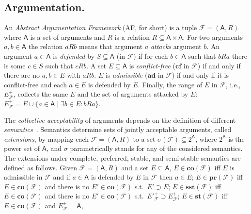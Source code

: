 \documentclass[conference,compsocconf]{IEEEtran}
\newcommand{\powerset}[1]{\ensuremath{2^{#1}}} %
\newcommand{\AF}{\ensuremath{\mathcal{F}}\xspace} %
\newcommand{\F}{\ensuremath{\mathcal{F}}\xspace} %
\newcommand{\args}{\ensuremath{\mathsf{A}}\xspace} %
\newcommand{\atts}{\ensuremath{R}\xspace}
\newcommand{\attackers}[2]{\ensuremath{\mathcal{F}_{#1}(#2)\xspace}} %
\newcommand{\AFC}{\ensuremath{\AF=(\args,\atts)}\xspace} %
\newcommand{\cA}{\ensuremath{\mathcal{A}}} %
\newcommand{\cB}{\ensuremath{\mathcal{B}}} %
\newcommand{\cC}{\ensuremath{\mathcal{C}}} %
\newcommand{\af}{AF}
\newcommand{\cf}{\mathbf{cf}}
\newcommand{\ad}{\mathbf{ad}}
\newcommand{\co}{\mathbf{co}}
\newcommand{\pr}{\mathbf{pr}}
\newcommand{\st}{\mathbf{st}}
\newcommand{\sst}{\mathbf{sst}}
\begin{document}
\subsection{Argumentation.}\label{sect:bgarg} An \emph{Abstract Argumentation Framework} (\af, for short) \cite{Dung:1995}
is a tuple $\F=(\args,\atts)$ where
\args is a set of arguments and
\atts is a relation $\atts\subseteq \args\times\args$.
For two arguments $a,b\in\args$ the relation $a \atts b$ means that argument $a$ \emph{attacks} argument $b$.
An argument $a \in \args$ is \emph{defended} by $S \subseteq \args$ (in $\F$)
if for each $b \in \args$ such that $b \atts a$
there is some $c \in S$ such that $c \atts b$.
A set $E \subseteq \args$ is \emph{conflict-free} ($\cf$ in \F) if and only if there are no $a,b\in E$ with $a \atts b$.
$E$ is \emph{admissible} ($\ad$ in \F) if and only if it is conflict-free and each $a \in E$ is defended by $E$.
Finally, the range of $E$ in $\F$, i.e., $E^{+}_\F$, collects the same $E$ and the set of arguments attacked by $E$: $E^{+}_\F=E \cup \{a\in\args \mid \exists b\in E: b \atts a\}$.


The \emph{collective acceptability} of  arguments depends on the definition of
different \textit{semantics}~\cite{Dung:1995}.  Semantics determine
sets of jointly acceptable arguments, called \emph{extensions}, by
mapping each \AFC to a set $\sigma(\F) \subseteq \powerset{\args}$, where $\powerset{\args}$ is the  power set of $\args$, and $\sigma$ parametrically stands for any of the considered semantics.
The extensions under complete, preferred, stable,  and semi-stable
semantics are defined as follows.
Given \AFC and a set $E \subseteq \args$, $E \in \co(\F)$ iff $E$ is admissible in $\F$ and if $a \in \args$ is defended by $E$ in $\F$ then $a\in E$;  $E \in \pr(\F)$ iff $E \in \co(\F)$ and there is no $E' \in \co(\F)$ s.t.\ $E' \supset E$; $E \in \sst(\F)$ iff $E \in \co(\F)$ and there is no $E' \in \co(\F)$ s.t.\ $E'^+_\F \supset E^+_\F$; $E \in \st(\F)$ iff $E \in \co(\F)$ and $E^+_\F = \args$,
\end{document}
